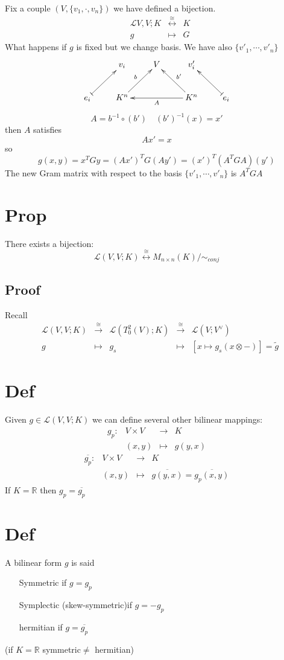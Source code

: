 \documentclass{book}
\begin{document}
Fix a couple $(V,\{v_1,\cdot,v_n\})$ we have defined a bijection.
$$\begin{aligned}
    &\mathscr{L}V,V;K&\stackrel{\cong}\leftrightarrow &K\\
    &g&\mapsto &G
\end{aligned}$$
What happens if $g$ is fixed but we change basis. We have also $\{v'_1,\cdots,v'_n\}$
$$\xymatrix{
    &v_i&V&v'_i&\\
    e_i\ar@{|->}[ur]&K^n\ar[ur]^b&&K^n\ar[ll]^A\ar[ul]_{b'}&e_i\ar@{|->}[lu]
}$$
$$A=b^{-1}\circ(b')\quad (b')^{-1}(x)=x'$$
then $A$ satisfies $$Ax'=x$$
so
$$g(x,y)=x^TGy=(Ax')^TG(Ay')=(x')^T(A^TGA)(y')$$
The new Gram matrix with respect to the basis $\{v'_1,\cdots,v'_n\}$ is $A^TGA$
\section{Prop}
There exists a bijection:
$$\mathscr{L}(V,V;K)\stackrel{\cong}\leftrightarrow M_{n\times n}(K)/\sim_{conj}$$
\subsection*{Proof}
Recall
$$
\begin{aligned}
&\mathscr{L}(V,V;K)&\stackrel{\cong}\rightarrow&\mathscr{L}(T_0^2(V);K)&\stackrel{\cong}\rightarrow&\mathscr{L}(V;V^\vee)\\
&g&\mapsto& g_s&\mapsto&[x\mapsto g_s(x\otimes-)]=\tilde{g}
\end{aligned}$$
\section{Def}
Given $g\in\mathscr{L}(V,V;K)$ we can define several other bilinear mappings:
$$\begin{aligned}
    g_p:&V\times V&\rightarrow&K\\ &(x,y)&\mapsto& g(y,x)
\end{aligned}$$
$$
\begin{aligned}
    \overline{g_p}:&V\times V&\rightarrow&K\\ &(x,y)&\mapsto& \overline{g(y,x)}=\overline{g_p(x,y)}
\end{aligned}$$
If $K=\mathbb{R}$ then $g_p=\overline{g_p}$
\section{Def}
A bilinear form $g$ is said\begin{itemize}
    \item [Symmetric] if $g=g_p$
    \item [Symplectic](skew-symmetric)if $g=-g_p$
    \item [hermitian] if $g=\overline{g_p}$
\end{itemize}
(if $K=\mathbb{R}$ symmetric$\neq$ hermitian)
\end{document}
